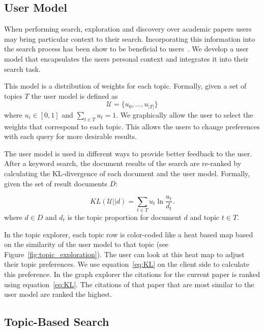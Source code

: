 \subsection{User Model}
When performing search, exploration and discovery over academic papers users 
may bring particular context to their search. Incorporating this information
into the search process has been show to be beneficial to 
users~\cite{DZSRWJ,MZPGSOL}.
We develop a user model that 
encapsulates the users personal context and integrates it into their
search task. 

This model is a distribution of weights for each topic.
Formally, given a set of topics $T$ the user model is defined as
$$
\mathcal{U} = \{u_0, \ldots, u_{|T|}\}
$$
where $u_i \in [0,1]$ and $\sum_{t \in T} u_t = 1$.
We graphically allow the user to select the weights that correspond to
each topic. This allows the users to change preferences with each query
for more desirable results.

The user model is used in different ways to provide better feedback to
the user. After a keyword search, the document results of the search 
are re-ranked by calculating the KL-divergence of each document and the
user model. Formally, given the set of result documents $D$:

\begin{equation} \label{eq:KL}
KL(\mathcal{U}||d) = \sum_{t \in T} u_t \ln \frac{u_t}{d_t}.
\end{equation}
where $d \in D$ and $d_t$ is the topic proportion for document $d$ and
topic $t \in T$. 

In the topic explorer, each topic row is color-coded like a heat 
based map based on the similarity of the user model to that topic (see Figure~\ref{fig:topic_exploration}).
The user can look at this heat map to adjust their topic preferences.
We use equation~\ref{eq:KL} on the client side to calculate this preference. 
In the graph explorer the citations for the current paper is ranked
using equation~\ref{eq:KL}. The citations of that paper that are most
similar to the user model are ranked the highest.


\subsection{Topic-Based Search}

